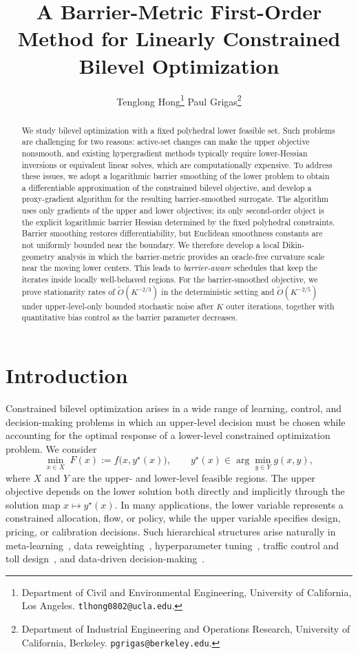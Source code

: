 \documentclass{article}
\title{A Barrier-Metric First-Order Method for Linearly Constrained Bilevel Optimization}
\author{%
  Tenglong Hong\thanks{Department of Civil and Environmental Engineering,
    University of California, Los Angeles. \texttt{tlhong0802@ucla.edu}.}
  \And
  Paul Grigas\thanks{Department of Industrial Engineering and Operations Research,
    University of California, Berkeley. \texttt{pgrigas@berkeley.edu}.}
}
\begin{document}
\maketitle


\begin{abstract}
We study bilevel optimization with a fixed polyhedral lower feasible set. Such problems are challenging for two reasons: active-set changes can make
the upper objective nonsmooth, and existing hypergradient methods typically
require lower-Hessian inversions or equivalent linear solves, which are
computationally expensive. To address these issues, we adopt a logarithmic barrier smoothing of the lower problem to obtain a
differentiable approximation of the constrained bilevel objective, and develop a proxy-gradient algorithm
for the resulting barrier-smoothed surrogate. The algorithm uses only gradients of the upper and lower objectives; its only second-order object is
the explicit logarithmic barrier Hessian determined by the fixed polyhedral constraints. Barrier smoothing restores differentiability, but Euclidean smoothness constants are not uniformly bounded near the boundary. We therefore develop a local Dikin-geometry analysis in which the barrier-metric provides
an oracle-free curvature scale near the moving lower centers. This leads to \textit{barrier-aware}
schedules that keep the iterates inside locally well-behaved regions. For the barrier-smoothed objective, we prove stationarity rates of \(\widetilde O(K^{-2/3})\) in the deterministic setting and
\(\widetilde O(K^{-2/5})\) under upper-level-only bounded stochastic noise after \(K\) outer iterations, together with quantitative bias
control as the barrier parameter decreases.
\end{abstract}

\section{Introduction}

Constrained bilevel optimization arises in a wide range of learning, control, and decision-making
problems in which an upper-level decision must be chosen while accounting for the optimal response
of a lower-level constrained optimization problem. We consider
\begin{equation}\label{eq:bi-level_constrained}
\min_{x\in X} \; F(x) := f\bigl(x,y^\star(x)\bigr),
\qquad
y^\star(x)\in\arg\min_{y\in Y} g(x,y),
\end{equation}
where \(X\) and \(Y\) are the upper- and lower-level feasible regions. The upper objective depends on
the lower solution both directly and implicitly through the solution map \(x\mapsto y^\star(x)\). In
many applications, the lower variable represents a constrained allocation, flow, or policy, while the
upper variable specifies design, pricing, or calibration decisions. 
Such hierarchical structures arise naturally in meta-learning~\citep{finn2017model},
data reweighting~\citep{ren2018learning}, hyperparameter tuning~\citep{franceschi2018bilevel},
traffic control and toll design~\citep{brotcorne2001bilevel}, and data-driven
decision-making~\citep{donti2017task,elmachtoub2022smart}.
\end{document}
